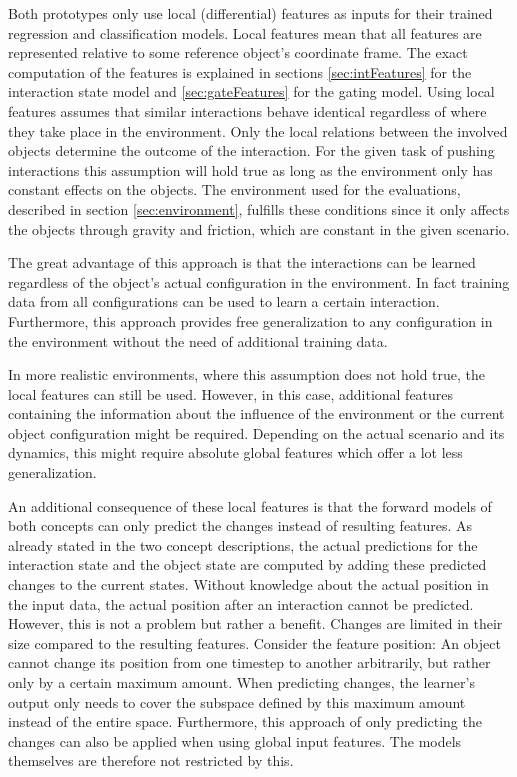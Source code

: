 Both prototypes only use local (differential) features as inputs for their trained regression and classification models. 
Local features mean that all features are represented relative to some reference object's coordinate frame. The exact computation of the features is explained in sections \ref{sec:intFeatures} for the interaction state model and \ref{sec:gateFeatures} for the gating model.
Using local features assumes that similar interactions behave identical regardless of where they take place in the environment. 
Only the local relations between the involved objects determine the outcome of the interaction. 
For the given task of pushing interactions this assumption will hold true as long as the environment only has constant effects on the objects. The environment used for the evaluations, described in section \ref{sec:environment}, fulfills these conditions since it only affects the objects through gravity and friction, which are constant in the given scenario. 

The great advantage of this approach is that the interactions can be learned regardless of the object's actual configuration in the environment. In fact training data from all configurations can be used to learn a certain interaction. Furthermore, this approach provides free generalization to any configuration in the environment without the need of additional training data.

In more realistic environments, where this assumption does not hold true, the local features can still be used. However, in this case, additional features containing the information about the influence of the environment or the current object configuration might be required. Depending on the actual scenario and its dynamics, this might require absolute global features which offer a lot less generalization.

An additional consequence of these local features is that the forward models of both concepts can only predict the changes instead of resulting features. As already stated in the two concept descriptions, the actual predictions for the interaction state and the object state are computed by adding these predicted changes to the current states.
Without knowledge about the actual position in the input data, the actual position after an interaction cannot be predicted. However, this is not a problem but rather a benefit. Changes are limited in their size compared to the resulting features. 
Consider the feature position: An object cannot change its position from one timestep to another arbitrarily, but rather only by a certain maximum amount. When predicting changes, the learner's output only needs to cover the subspace defined by this maximum amount instead of the entire space. Furthermore, this approach of only predicting the changes can also be applied when using global input features. The models themselves are therefore not restricted by this.


